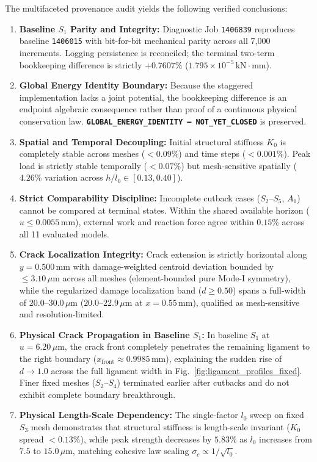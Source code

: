The multifaceted provenance audit yields the following verified conclusions:
\begin{enumerate}
  \item \textbf{Baseline $S_1$ Parity and Integrity:} Diagnostic Job \texttt{1406839} reproduces baseline \texttt{1406015} with bit-for-bit mechanical parity across all 7,000 increments. Logging persistence is reconciled; the terminal two-term bookkeeping difference is strictly $+0.7607\%$ ($1.795\times 10^{-5}\,\mathrm{kN\cdot mm}$).
  \item \textbf{Global Energy Identity Boundary:} Because the staggered implementation lacks a joint potential, the bookkeeping difference is an endpoint algebraic consequence rather than proof of a continuous physical conservation law. \textbf{\texttt{GLOBAL\_ENERGY\_IDENTITY --- NOT\_YET\_CLOSED}} is preserved.
  \item \textbf{Spatial and Temporal Decoupling:} Initial structural stiffness $K_0$ is completely stable across meshes ($<0.09\%$) and time steps ($<0.001\%$). Peak load is strictly stable temporally ($<0.07\%$) but mesh-sensitive spatially ($4.26\%$ variation across $h/l_0 \in [0.13, 0.40]$).
  \item \textbf{Strict Comparability Discipline:} Incomplete cutback cases ($S_2$--$S_5$, $A_1$) cannot be compared at terminal states. Within the shared available horizon ($u \le 0.0055\,\mathrm{mm}$), external work and reaction force agree within $0.15\%$ across all 11 evaluated models.
  \item \textbf{Crack Localization Integrity:} Crack extension is strictly horizontal along $y = 0.500\,\mathrm{mm}$ with damage-weighted centroid deviation bounded by $\le 3.10\,\mu\mathrm{m}$ across all meshes (element-bounded pure Mode-I symmetry), while the regularized damage localization band ($d \ge 0.50$) spans a full-width of $20.0$--$30.0\,\mu\mathrm{m}$ ($20.0$--$22.9\,\mu\mathrm{m}$ at $x=0.55\,\mathrm{mm}$), qualified as mesh-sensitive and resolution-limited.
  \item \textbf{Physical Crack Propagation in Baseline $S_1$:} In baseline $S_1$ at $u = 6.20\,\mu\mathrm{m}$, the crack front completely penetrates the remaining ligament to the right boundary ($x_{\mathrm{front}} \approx 0.9985\,\mathrm{mm}$), explaining the sudden rise of $d \to 1.0$ across the full ligament width in Fig.~\ref{fig:ligament_profiles_fixed}. Finer fixed meshes ($S_2$--$S_4$) terminated earlier after cutbacks and do not exhibit complete boundary breakthrough.
  \item \textbf{Physical Length-Scale Dependency:} The single-factor $l_0$ sweep on fixed $S_3$ mesh demonstrates that structural stiffness is length-scale invariant ($K_0$ spread $< 0.13\%$), while peak strength decreases by $5.83\%$ as $l_0$ increases from $7.5$ to $15.0\,\mu\mathrm{m}$, matching cohesive law scaling $\sigma_c \propto 1/\sqrt{l_0}$.

\end{enumerate}
